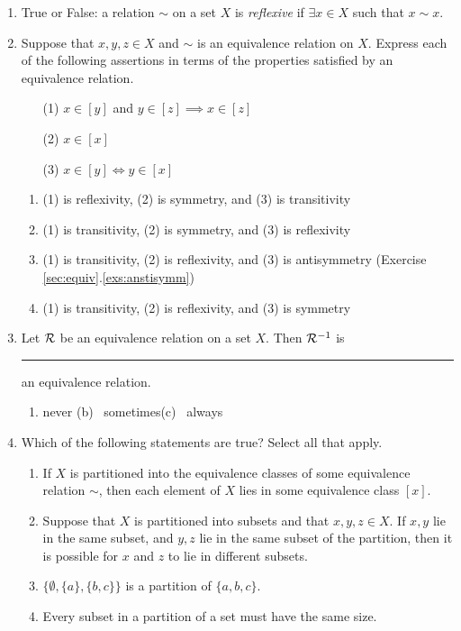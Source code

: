 \pagestyle{empty}


\begin{enumerate}
	\item True or False: a relation $\sim$ on a set $X$ is \emph{reflexive} if $\exists x\in X$ such that $x\sim x$.


	\item Suppose that $x,y,z\in X$ and $\sim$ is an equivalence relation on $X$. Express each of the following assertions in terms of the properties satisfied by an equivalence relation.
  \begin{itemize}
    \item[(1)] $x\in[y]$ and $y\in[z]\implies x\in[z]$
    \item[(2)] $x\in[x]$
    \item[(3)] $x\in[y]\iff y\in[x]$
  \end{itemize}
  \begin{enumerate}
  	 \item (1) is reflexivity, (2) is symmetry, and (3) is transitivity
  	 \item (1) is transitivity, (2) is symmetry, and (3) is reflexivity
  	 \item (1) is transitivity, (2) is reflexivity, and (3) is antisymmetry (Exercise \ref{sec:equiv}.\ref*{exs:anstisymm})
  	 \item (1) is transitivity, (2) is reflexivity, and (3) is symmetry
 	\end{enumerate}
  	
  	
	\item Let $\mathcal{R}$ be an equivalence relation on a set $X$. Then $\mathcal{R}^{-1}$ is \rule{2cm}{0.15mm} an equivalence relation.
	\begin{enumerate}
    \item never \qquad\qquad (b) \ sometimes\qquad\qquad (c) \ always
	\end{enumerate}


	\item Which of the following statements are true? Select all that apply.
	\begin{enumerate}
    \item If $X$ is partitioned into the equivalence classes of some equivalence relation $\sim$, then each element of $X$ lies in some equivalence class $[x]$.
    \item Suppose that $X$ is partitioned into subsets and that $x,y,z\in X$. If $x,y$ lie in the same subset, and $y,z$ lie in the same subset of the partition, then it is possible for $x$ and $z$ to lie in different subsets.
    \item $\bigl\{\emptyset, \{a\}, \{b,c\}\bigr\}$ is a partition of $\{a,b,c\}$.
    \item Every subset in a partition of a set must have the same size.
	\end{enumerate}



\end{enumerate}
